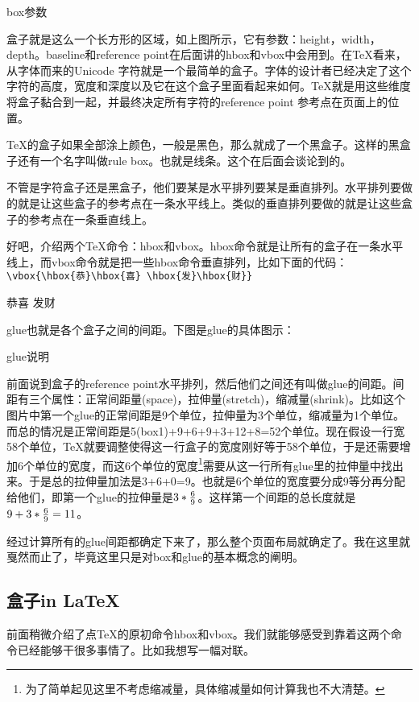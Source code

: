 \begin{fig}{box参数}
\label{fig:box参数}
\end{fig}

盒子就是这么一个长方形的区域，如上图所示，它有参数：height，width，depth。baseline和reference point在后面讲的hbox和vbox中会用到。在\TeX 看来，从字体而来的Unicode 字符就是一个最简单的盒子。字体的设计者已经决定了这个字符的高度，宽度和深度以及它在这个盒子里面看起来如何。\TeX 就是用这些维度将盒子黏合到一起，并最终决定所有字符的reference point 参考点在页面上的位置。

\TeX 的盒子如果全部涂上颜色，一般是黑色，那么就成了一个黑盒子。这样的黑盒子还有一个名字叫做rule box。也就是线条。这个在后面会谈论到的。

不管是字符盒子还是黑盒子，他们要某是水平排列要某是垂直排列。水平排列要做的就是让这些盒子的参考点在一条水平线上。类似的垂直排列要做的就是让这些盒子的参考点在一条垂直线上。

好吧，介绍两个\TeX 命令：hbox和vbox。hbox命令就是让所有的盒子在一条水平线上，而vbox命令就是把一些hbox命令垂直排列，比如下面的代码：\\
\verb+\vbox{\hbox{恭}\hbox{喜} \hbox{发}\hbox{财}}+

\vbox{\hbox{恭}\hbox{喜} \hbox{发}\hbox{财}}

glue也就是各个盒子之间的间距。下图是glue的具体图示：
\begin{fig}{glue说明}
\label{fig:glue说明}
\end{fig}
前面说到盒子的reference point水平排列，然后他们之间还有叫做glue的间距。间距有三个属性：正常间距量(space)，拉伸量(stretch)，缩减量(shrink)。比如这个图片中第一个glue的正常间距是9个单位，拉伸量为3个单位，缩减量为1个单位。而总的情况是正常间距是5(box1)+9+6+9+3+12+8=52个单位。现在假设一行宽58个单位，\TeX 就要调整使得这一行盒子的宽度刚好等于58个单位，于是还需要增加6个单位的宽度，而这6个单位的宽度\footnote{为了简单起见这里不考虑缩减量，具体缩减量如何计算我也不大清楚。}需要从这一行所有glue里的拉伸量中找出来。于是总的拉伸量加法是3+6+0=9。也就是6个单位的宽度要分成9等分再分配给他们，即第一个glue的拉伸量是$3*\Large{\frac { 6 }{ 9 }} $。这样第一个间距的总长度就是$9+3*\Large{\frac { 6 }{ 9 }} =11$。

经过计算所有的glue间距都确定下来了，那么整个页面布局就确定了。我在这里就戛然而止了，毕竟这里只是对box和glue的基本概念的阐明。

\subsection{盒子in \LaTeX}
前面稍微介绍了点\TeX 的原初命令hbox和vbox。我们就能够感受到靠着这两个命令已经能够干很多事情了。比如我想写一幅对联。

